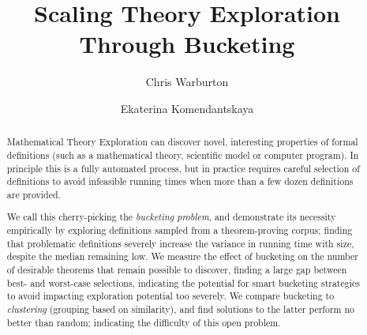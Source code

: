\documentclass[]{article}
\begin{document}
\mainmatter  %

\title{Scaling Theory Exploration Through Bucketing}


%
%
\author{Chris Warburton%
\and Ekaterina Komendantskaya}
%


%
%

\maketitle

\begin{abstract}
  Mathematical Theory Exploration can discover novel, interesting properties of
  formal definitions (such as a mathematical theory, scientific model or
  computer program). In principle this is a fully automated process, but in
  practice requires careful selection of definitions to avoid infeasible running
  times when more than a few dozen definitions are provided.

  We call this cherry-picking the \emph{bucketing problem}, and demonstrate its
  necessity empirically by exploring definitions sampled from a theorem-proving
  corpus; finding that problematic definitions severely increase the variance in
  running time with size, despite the median remaining low. We measure the
  effect of bucketing on the number of desirable theorems that remain possible
  to discover, finding a large gap between best- and worst-case selections,
  indicating the potential for smart bucketing strategies to avoid impacting
  exploration potential too severely. We compare bucketing to \emph{clustering}
  (grouping based on similarity), and find solutions to the latter perform no
  better than random; indicating the difficulty of this open problem.
\end{abstract}














\end{document}
